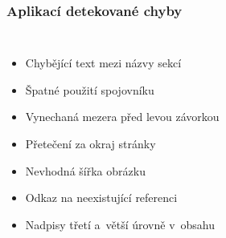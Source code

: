 \begin{frame}
  \frametitle{Aplikací detekované chyby}
  \begin{columns}
      \vspace*{-30pt}
      \begin{itemize}
        \pause
        \item Chybějící text mezi názvy sekcí
        \pause
        \item Špatné použití spojovníku
        \pause
        \item Vynechaná mezera před levou závorkou
        \pause
        \item Přetečení za okraj stránky
        \pause
        \item Nevhodná šířka obrázku
        \pause
        \item Odkaz na neexistující referenci
        \pause
        \item Nadpisy třetí a~větší úrovně v~obsahu
      \end{itemize}
      

\end{columns}
\end{frame}
